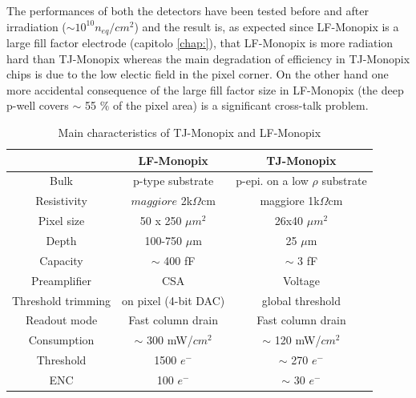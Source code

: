 The performances of both the detectors have been tested before and after irradiation ($\sim 10^{10} n_{eq}/cm^{2}$) and the result is, as expected since LF-Monopix is a large fill factor electrode (capitolo \ref{chap:}), that LF-Monopix is more radiation hard than TJ-Monopix whereas the main degradation of efficiency in TJ-Monopix chips is due to the low electic field in the pixel corner. On the other hand one more accidental consequence of the large fill factor size in LF-Monopix (the deep p-well covers $\sim$ 55 $\%$ of the pixel area) is a significant cross-talk problem.
\begin{table}
    \begin{center}
    \begin{tabular}{|c | c |c |}
    \hline
    & LF-Monopix & TJ-Monopix\\
    \hline
    \hline
    Bulk & p-type substrate & p-epi. on a low $\rho$ substrate \\
    Resistivity & $maggiore$ 2k$\Omega$cm & maggiore 1k$\Omega$cm\\
    Pixel size & 50 x 250 $\mu m^2$ & 26x40 $\mu m^2$ \\
    Depth & 100-750 $\mu$m & 25 $\mu$m \\
    Capacity & $\sim$ 400 fF & $\sim$ 3 fF\\
    Preamplifier & CSA & Voltage \\
    Threshold trimming & on pixel (4-bit DAC) & global threshold\\
    Readout mode & Fast column drain & Fast column drain\\
    Consumption & $\sim$ 300 mW/$cm^2$& $\sim$ 120 mW/$cm^2$ \\
    Threshold & 1500 $e^-$ & $\sim$ 270 $e^-$ \\
    ENC & 100 $e^-$ & $\sim$ 30 $e^-$\\
    \hline
    \end{tabular}
    \caption{Main characteristics of TJ-Monopix and LF-Monopix \cite{LF-TJ-Monopix}}
    \label{tab:LF-TJ-Monopix}
    \end{center}
 \end{table}

